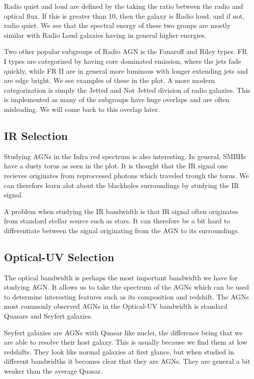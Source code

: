 \documentclass{article}
\begin{document}
Radio quiet and loud are defined by the taking the ratio between the radio and optical flux. If this is greater than 10, then the galaxy is Radio loud, and if not, radio quiet. We see that the spectral energy of these two groups are mostly similar with Radio Loud galaxies having in general higher energies.

Two other popular subgroups of Radio AGN is the Fanaroff and Riley types.
FR I types are categorized by having core dominated emission, where the jets fade quickly, while FR II are in general more luminous with longer extending jets and are edge bright. We see examples of these in the plot. A more modern categorization is simply the Jetted and Not Jetted division of radio galaxies. This is implemented as many of the subgroups have huge overlaps and are often misleading. We will come back to this overlap later.

\subsection*{IR Selection}
Studying AGNs in the Infra red spectrum is also interesting. In general, SMBHs have a dusty torus as seen in the plot. It is thought that the IR signal one recieves originates from reproccesed photons which traveled trough the torus. We can therefore learn alot about the blackholes surroundings by studying the IR signal. 

A problem when studying the IR bandwidth is that IR signal often originates from standard stellar source such as stars. It can therefore be a bit hard to differentiate between the signal originating from the AGN to its surroundings.

\subsection*{Optical-UV Selection}
The optical bandwidth is perhaps the most important bandwidth we have for studying AGN. It allows us to take the spectrum of the AGNs which can be used to determine interesting features such as its composition and redshift. The AGNs most commonly observed AGNs in the Optical-UV bandwidth is standard Quasars and Seyfert galaxies.

Seyfert galaxies are AGNs with Quasar like nuclei, the difference being that we are able to resolve their host galaxy. This is usually because we find them at low redshifts. They look like normal galaxies at first glance, but when studied in different bandwidths it becomes clear that they are AGNs. They are general a bit weaker than the average Quasar.
\end{document}

